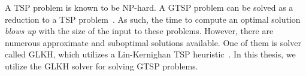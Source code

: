 \documentclass[../main.tex]{subfiles}
\begin{document}
A TSP problem is known to be NP-hard. A GTSP problem can be solved as a reduction to a TSP problem~\cite{noon1993efficient}. As such, the time to compute an optimal solution \emph{blows up} with the size of the input to these problems. However, there are numerous approximate and suboptimal solutions available. One of them is solver called GLKH, which utilizes a Lin-Kernighan TSP heuristic~\cite{helsgaun2009general}. In this thesis, we utilize the GLKH solver for solving GTSP problems.





\end{document}
